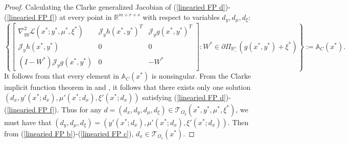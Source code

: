 \documentclass[11pt]{article}
\theoremstyle{definition}
\theoremstyle{remark}
\numberwithin{equation}{section}
\begin{document}
\begin{proof}
  Calculating the Clarke generalized Jacobian of (\ref{linearied FP d})-(\ref{linearied FP f}) at every point in $\mathbb{R}^{m+r+s}$ with respect to variables
  $d_y,d_{\mu},d_{\xi}:$
  \begin{equation*}
  \left\{\left[
		\begin{array}{ccc}
			\nabla_{yy}^2 \mathcal{L}(x^*;y^*,\mu^*,\xi^*)&\mathcal{J}_y h(x^*,y^*)^T&\mathcal{J}_y g(x^*,y^*)^T\\
             \mathcal{J}_y h(x^*,y^*)&0&0\\
			(I-W^*)\mathcal{J}_y g(x^*,y^*)&0&-W^*
		\end{array}\right]:W^*\in \partial \Pi_{\mathbb{R}^s_{-} }(g(x^*,y^*)+\xi^*)\right\}:=\mathbb{A}_C(x^*).
\end{equation*}
It follows from \cite[Proposition 2.2]{Daiyh and Zhanglw} that every element in $ \mathbb{A}_C(x^*)$ is nonsingular.
From the Clarke implicit function theorem in \cite[Corollary of Theorem 7.1.1]{Clarke} and \cite[Proposition 2.6.5]{Clarke},
it follows that there exists only one solution $(d_x,y'(x^*;d_x),\mu'(x^*;d_x),\xi'(x^*;d_x))$ satisfying (\ref{linearied FP d})-(\ref{linearied FP f}).
Thus for any $d=(d_x, d_y,d_{\mu},d_{\xi})\in \mathcal{T}_{\Omega_2}(x^*,y^*,\mu^*,\xi^*)$, we must have that $(d_y,d_{\mu},d_{\xi})=(y'(x^*;d_x),\mu'(x^*;d_x),\xi'(x^*;d_x))$.
Then from (\ref{linearied FP b})-(\ref{linearied FP c}), $d_x\in \mathcal{T}_{\Omega_1}(x^*)$.


\end{proof}
\end{document}
